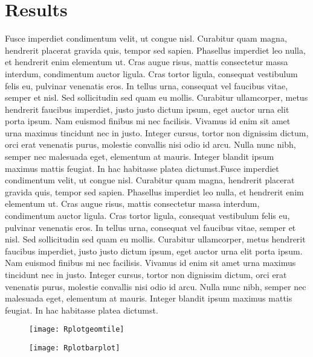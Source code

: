 \documentclass[letterpaper]{article}
\begin{document}
\section{Results}
Fusce imperdiet condimentum velit, ut congue nisl. Curabitur quam magna, hendrerit placerat gravida quis, tempor sed sapien. Phasellus imperdiet leo nulla, et hendrerit enim elementum ut. Cras augue risus, mattis consectetur massa interdum, condimentum auctor ligula. Cras tortor ligula, consequat vestibulum felis eu, pulvinar venenatis eros. In tellus urna, consequat vel faucibus vitae, semper et nisl. Sed sollicitudin sed quam eu mollis. Curabitur ullamcorper, metus hendrerit faucibus imperdiet, justo justo dictum ipsum, eget auctor urna elit porta ipsum. Nam euismod finibus mi nec facilisis. Vivamus id enim sit amet urna maximus tincidunt nec in justo. Integer cursus, tortor non dignissim dictum, orci erat venenatis purus, molestie convallis nisi odio id arcu. Nulla nunc nibh, semper nec malesuada eget, elementum at mauris. Integer blandit ipsum maximus mattis feugiat. In hac habitasse platea dictumst.Fusce imperdiet condimentum velit, ut congue nisl. Curabitur quam magna, hendrerit placerat gravida quis, tempor sed sapien. Phasellus imperdiet leo nulla, et hendrerit enim elementum ut. Cras augue risus, mattis consectetur massa interdum, condimentum auctor ligula. Cras tortor ligula, consequat vestibulum felis eu, pulvinar venenatis eros. In tellus urna, consequat vel faucibus vitae, semper et nisl. Sed sollicitudin sed quam eu mollis. Curabitur ullamcorper, metus hendrerit faucibus imperdiet, justo justo dictum ipsum, eget auctor urna elit porta ipsum. Nam euismod finibus mi nec facilisis. Vivamus id enim sit amet urna maximus tincidunt nec in justo. Integer cursus, tortor non dignissim dictum, orci erat venenatis purus, molestie convallis nisi odio id arcu. Nulla nunc nibh, semper nec malesuada eget, elementum at mauris. Integer blandit ipsum maximus mattis feugiat. In hac habitasse platea dictumst. 

\begin{figure}[h]
	\centering
	\texttt{[image: Rplotgeomtile]}
\end{figure}

\begin{figure}[h]
	\centering
	\texttt{[image: Rplotbarplot]}
\end{figure}
\end{document}
